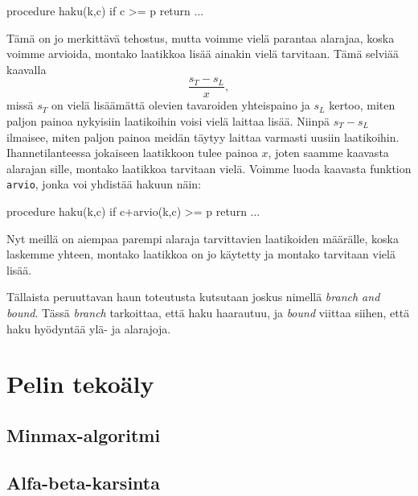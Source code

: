 \begin{code}
procedure haku(k,c)
    if c >= p
        return
    ...
\end{code}

Tämä on jo merkittävä tehostus, mutta voimme vielä parantaa
alarajaa, koska voimme arvioida, montako laatikkoa
lisää ainakin vielä tarvitaan. Tämä selviää kaavalla
\[
\frac{s_T-s_L}{x},
\]
missä $s_T$ on vielä lisäämättä olevien tavaroiden yhteispaino ja
$s_L$ kertoo, miten paljon painoa nykyisiin laatikoihin
voisi vielä laittaa lisää.
Niinpä $s_T-s_L$ ilmaisee, miten paljon painoa meidän täytyy
laittaa varmasti uusiin laatikoihin.
Ihannetilanteessa jokaiseen laatikkoon tulee painoa $x$,
joten saamme kaavasta alarajan sille, montako laatikkoa tarvitaan vielä.
Voimme luoda kaavasta funktion \texttt{arvio},
jonka voi yhdistää hakuun näin:

\begin{code}
procedure haku(k,c)
    if c+arvio(k,c) >= p
        return
    ...
\end{code}

Nyt meillä on aiempaa parempi alaraja tarvittavien laatikoiden määrälle,
koska laskemme yhteen, montako laatikkoa on jo käytetty ja montako
tarvitaan vielä lisää.

Tällaista peruuttavan haun toteutusta kutsutaan joskus nimellä
\emph{branch and bound}.
Tässä \emph{branch} tarkoittaa, että haku haarautuu,
ja \emph{bound} viittaa siihen, että haku hyödyntää
ylä- ja alarajoja.

\section{Pelin tekoäly}

\subsection{Minmax-algoritmi}

\subsection{Alfa-beta-karsinta}